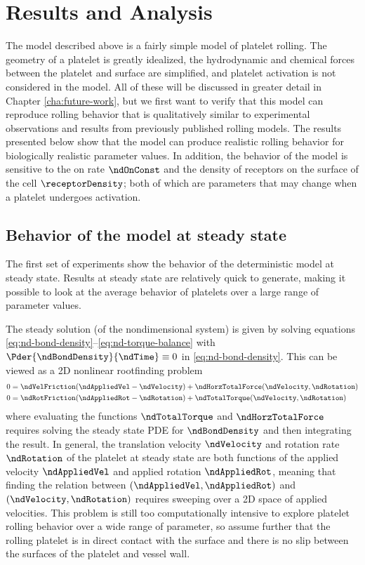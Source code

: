 
\chapter{Results and Analysis}
\label{cha:results}

The model described above is a fairly simple model of platelet
rolling. The geometry of a platelet is greatly idealized, the
hydrodynamic and chemical forces between the platelet and surface are
simplified, and platelet activation is not considered in the
model. All of these will be discussed in greater detail in Chapter
\ref{cha:future-work}, but we first want to verify that this model can
reproduce rolling behavior that is qualitatively similar to
experimental observations and results from previously published
rolling models. The results presented below show that the model can
produce realistic rolling behavior for biologically realistic
parameter values. In addition, the behavior of the model is sensitive
to the on rate $\ndOnConst$ and the density of receptors on the
surface of the cell $\receptorDensity$; both of which are parameters
that may change when a platelet undergoes activation.

\section{Behavior of the model at steady state}
\label{sec:behav-model-steady}

The first set of experiments show the behavior of the deterministic
model at steady state. Results at steady state are relatively quick to
generate, making it possible to look at the average behavior of
platelets over a large range of parameter values. 

The steady solution (of the nondimensional system) is given by solving
equations \eqref{eq:nd-bond-density}--\eqref{eq:nd-torque-balance}
with $\Pder{\ndBondDensity}{\ndTime} \equiv 0$ in
\eqref{eq:nd-bond-density}. This can be viewed as a 2D nonlinear
rootfinding problem
\begin{align}
  \label{eq:2D-ss-translation}
  0 &= \ndVelFriction (\ndAppliedVel - \ndVelocity) +
      \ndHorzTotalForce(\ndVelocity, \ndRotation) \\
  \label{eq:2D-ss-rotation}
  0 &= \ndRotFriction (\ndAppliedRot - \ndRotation) +
      \ndTotalTorque(\ndVelocity, \ndRotation)
\end{align}
where evaluating the functions $\ndTotalTorque$ and
$\ndHorzTotalForce$ requires solving the steady state PDE for
$\ndBondDensity$ and then integrating the result. In general, the
translation velocity $\ndVelocity$ and rotation rate $\ndRotation$ of
the platelet at steady state are both functions of the applied
velocity $\ndAppliedVel$ and applied rotation $\ndAppliedRot$, meaning
that finding the relation between $(\ndAppliedVel, \ndAppliedRot)$ and
$(\ndVelocity, \ndRotation)$ requires sweeping over a 2D space of
applied velocities. This problem is still too computationally
intensive to explore platelet rolling behavior over a wide range of
parameter, so assume further that the rolling platelet is in direct
contact with the surface and there is no slip between the surfaces of
the platelet and vessel wall.

